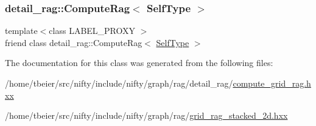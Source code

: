 \subsubsection{\texorpdfstring{detail\+\_\+rag\+::\+Compute\+Rag$<$ Self\+Type $>$}{detail\_rag::ComputeRag< SelfType >}}
{\footnotesize\ttfamily template$<$class L\+A\+B\+E\+L\+\_\+\+P\+R\+O\+XY $>$ \\
friend class detail\+\_\+rag\+::\+Compute\+Rag$<$ \hyperlink{classnifty_1_1graph_1_1GridRagStacked2D}{Self\+Type} $>$\hspace{0.3cm}{\ttfamily [friend]}}



The documentation for this class was generated from the following files\+:\begin{DoxyCompactItemize}
\item 
/home/tbeier/src/nifty/include/nifty/graph/rag/detail\+\_\+rag/\hyperlink{compute__grid__rag_8hxx}{compute\+\_\+grid\+\_\+rag.\+hxx}\item 
/home/tbeier/src/nifty/include/nifty/graph/rag/\hyperlink{grid__rag__stacked__2d_8hxx}{grid\+\_\+rag\+\_\+stacked\+\_\+2d.\+hxx}\end{DoxyCompactItemize}
